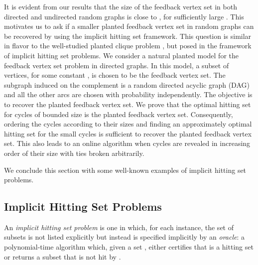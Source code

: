 \documentclass[11pt]{article}
\begin{document}
It is evident from our results that the size of the feedback vertex set in both directed and undirected random graphs is close to , for sufficiently large . This motivates us to ask if a smaller planted feedback vertex set in random graphs can be recovered by using the implicit hitting set framework. This question is similar in flavor to the well-studied planted clique problem \cite{jerrumClique92,sudakov98,frieze08}, but posed in the framework of implicit hitting set problems. We consider a natural planted model for the feedback vertex set problem in directed graphs. In this model, a subset of  vertices, for some constant , is chosen to be the feedback vertex set. The subgraph induced on the complement is a random directed acyclic graph (DAG) and all the other arcs are chosen with probability  independently. The objective is to recover the planted feedback vertex set. We prove that the optimal hitting set for cycles of bounded size is the planted feedback vertex set. Consequently, ordering the cycles according to their sizes and finding an approximately optimal hitting set for the small cycles is sufficient to recover the planted feedback vertex set. This also leads to an online algorithm when cycles are revealed in increasing order of their size with ties broken arbitrarily.


We conclude this section with some well-known examples of implicit hitting set problems.

\subsection{Implicit Hitting Set Problems}


An {\it implicit hitting set problem} is one in which, for each instance, the
set of subsets is not listed explicitly but instead is specified implicitly by
an {\it oracle}: a polynomial-time algorithm which, given a set ,
either certifies that  is a hitting set or returns a subset that is not hit
by .
\end{document}
